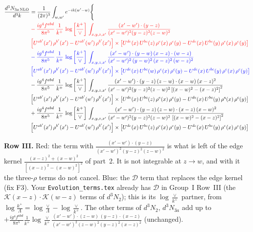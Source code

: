 \documentclass[9pt]{article}
\numberwithin{equation}{section}
\newcommand{\new}[1]{{\color{blue}#1}}
\newcommand{\nc}{\color{blue}}
\newcommand{\rc}{\color{red}}
\begin{document}
\begin{align}
\frac{d^{3}N_{3a\,\rm NLO}}{d^{3}k} & =\frac{1}{(2\pi)^{3}}\int_{w,w'}e^{-ik(w'-w)}\Bigg\{\notag \\ & \rc -\frac{ig^{4}f^{abd}}{8\pi^{5}}\,\frac{1}{k^{+}}\, \log{\left[\frac{k^{+}}{\vee}\right]}\,\int_{x,y,z,x'}
\frac{(x'-w')\cdot(y-z)}{(x'-w')^{2}(y-z)^{2}(z-w)^{2}}\notag \\ & \rc \left[U^{ab'}(x')\,\rho^{b'}(x')-U^{ab'}(w')\, \rho^{b'}(x')\right]\times \left[U^{de}(x)\,U^{bc}(z)\, \rho^{e}(x)\,\rho^{c}(y)-U^{de}(x)\,U^{bc}(y)\,\rho^{e}(x)\,\rho^{c}(y)\right]\notag \\
& \nc -\frac{ig^{4}f^{abd}}{8\pi^{5}}\,\frac{1}{k^{+}}\, \log{\left[\frac{k^{+}}{\vee}\right]}\,\int_{x,y,z,x'}
\frac{(x'-w')\cdot(y-w)\,(x-z)\cdot(w-z)}{(x'-w')^{2}\,(y-w)^{2}\,(x-z)^{2}\,(w-z)^{2}}\notag \\ & \nc \left[U^{ab'}(x')\,\rho^{b'}(x')-U^{ab'}(w')\, \rho^{b'}(x')\right]\times \left[U^{de}(x)\,U^{bc}(w)\, \rho^{e}(x)\,\rho^{c}(y)-U^{de}(x)\,U^{bc}(y)\,\rho^{e}(x)\,\rho^{c}(y)\right]\notag \\ & -\frac{ig^{4}f^{abd}}{8\pi^{5}}\,\frac{1}{k^{+}}\, \log{\left[\frac{k^{+}}{\vee}\right]}\,\int_{x,y,z,x'}
\frac{(x'-w')\cdot(y-z)\,(z-w)\cdot(x-w)\,(x-z)^{2}}{(x'-w')^{2}(y-z)^{2}(z-w)^{2}\left[(x-w)^{2}-(x-z)^{2}\right]^{2}}\notag \\ & \left[U^{ab'}(x')\,\rho^{b'}(x')-U^{ab'}(w')\, \rho^{b'}(x')\right]\times \left[U^{de}(x)\,U^{bc}(z)\, \rho^{e}(x)\,\rho^{c}(y)-U^{de}(x)\,U^{bc}(y)\,\rho^{e}(x)\,\rho^{c}(y)\right]\notag \\ & +\frac{ig^{4}f^{abd}}{8\pi^{5}}\,\frac{1}{k^{+}}\, \log{\left[\frac{k^{+}}{\vee}\right]}\,\int_{x,y,z,x'}
\frac{(x'-w')\cdot(y-z)\,(z-w)\cdot(x-z)\,(x-w)^{2}}{(x'-w')^{2}(y-z)^{2}(z-w)^{2}\,\left[(x-w)^{2}-(x-z)^{2}\right]^{2}}\notag \\ & \left[U^{ab'}(x')\,\rho^{b'}(x')-U^{ab'}(w')\, \rho^{b'}(x')\right]\times \left[U^{de}(x)\,U^{bc}(z)\, \rho^{e}(x)\,\rho^{c}(y)-U^{de}(x)\,U^{bc}(y)\,\rho^{e}(x)\,\rho^{c}(y)\right]
\end{align}

\new{\textbf{Row III.} Red: the term with $\frac{(x'-w')\cdot(y-z)}{(x'-w')^2(y-z)^2(z-w)^2}$ is what is left of the edge kernel $\frac{(x-z)^2+(x-w)^2}{[(x-z)^2-(x-w)^2]^2}$ of part~2. It is not integrable at $z\to w$, and with it the three-$\rho$ terms do not cancel. Blue: the $\mathcal D$ term that replaces the edge kernel (fix F3). Your \texttt{Evolution\_terms.tex} already has $\mathcal D$ in Group~I Row~III (the $\mathcal K(x-z)\cdot\mathcal K(w-z)$ terms of $d^3N_{2}$); this is its $\log\frac{\vee}{k^+}$ partner, from $\log\frac{k^+}{\Lambda}=\log\frac{\vee}{\Lambda}-\log\frac{\vee}{k^+}$. The other terms of $d^3N_2$, $d^3N_{3a}$ add up to $+\frac{ig^4f^{abd}}{8\pi^5}\frac{1}{k^+}\log\frac{\vee}{k^+}\frac{(x'-w')\cdot(z-w)\,(y-z)\cdot(x-z)}{(x'-w')^2(z-w)^2(y-z)^2(x-z)^2}$ (unchanged).}
\end{document}
